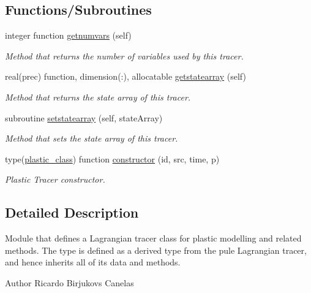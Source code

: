\subsection*{Functions/\+Subroutines}
\begin{DoxyCompactItemize}
\item 
integer function \mbox{\hyperlink{namespacetracerplastic__mod_aa5367c2562d10b5393f263394f07fa49}{getnumvars}} (self)
\begin{DoxyCompactList}\small\item\em Method that returns the number of variables used by this tracer. \end{DoxyCompactList}\item 
real(prec) function, dimension(\+:), allocatable \mbox{\hyperlink{namespacetracerplastic__mod_aa8cdd2196261b216dd6cdd5b7ef2fe90}{getstatearray}} (self)
\begin{DoxyCompactList}\small\item\em Method that returns the state array of this tracer. \end{DoxyCompactList}\item 
subroutine \mbox{\hyperlink{namespacetracerplastic__mod_a5e5bd350455400938950d2129c1f4980}{setstatearray}} (self, state\+Array)
\begin{DoxyCompactList}\small\item\em Method that sets the state array of this tracer. \end{DoxyCompactList}\item 
type(\mbox{\hyperlink{structtracerplastic__mod_1_1plastic__class}{plastic\+\_\+class}}) function \mbox{\hyperlink{namespacetracerplastic__mod_ae68444b860b6e7abf3940b0ee1bfe57a}{constructor}} (id, src, time, p)
\begin{DoxyCompactList}\small\item\em Plastic Tracer constructor. \end{DoxyCompactList}\end{DoxyCompactItemize}


\subsection{Detailed Description}
Module that defines a Lagrangian tracer class for plastic modelling and related methods. The type is defined as a derived type from the pule Lagrangian tracer, and hence inherits all of it\textquotesingle{}s data and methods. 

\begin{DoxyAuthor}{Author}
Ricardo Birjukovs Canelas 
\end{DoxyAuthor}


